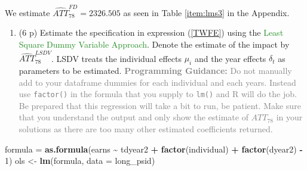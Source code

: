 \documentclass[
]{article}
\newenvironment{Shaded}{\begin{snugshade}}{\end{snugshade}}
\newcommand{\AttributeTok}[1]{\textcolor[rgb]{0.13,0.29,0.53}{#1}}
\newcommand{\DecValTok}[1]{\textcolor[rgb]{0.00,0.00,0.81}{#1}}
\newcommand{\FunctionTok}[1]{\textcolor[rgb]{0.13,0.29,0.53}{\textbf{#1}}}
\newcommand{\NormalTok}[1]{#1}
\newcommand{\OtherTok}[1]{\textcolor[rgb]{0.56,0.35,0.01}{#1}}
\newcommand{\SpecialCharTok}[1]{\textcolor[rgb]{0.81,0.36,0.00}{\textbf{#1}}}
\providecommand{\tightlist}{%
  \setlength{\itemsep}{0pt}\setlength{\parskip}{0pt}}
\begin{document}
\begin{Shaded}
\end{Shaded}

We estimate \(\widehat{ATT}_{78}^{FD} = 2326.505\) as seen in Table
\ref{item:lms3} in the Appendix.

\begin{enumerate}
\def\labelenumi{\arabic{enumi}.}
\setcounter{enumi}{2}
\tightlist
\item
  (6 p) Estimate the specification in expression (\ref{TWFE}) using the
  \textcolor{ForestGreen}{Least Square Dummy Variable Approach}. Denote
  the estimate of the impact by \(\widehat{ATT}_{78}^{LSDV}\). LSDV
  treats the individual effects \(\mu_i\) and the year effects
  \(\delta_t\) as parameters to be estimated.
  \textcolor{Gray}{\textbf{Programming Guidance:} Do not manually add to your dataframe dummies for each individual and each years. Instead use \texttt{factor()} in the formula that you supply to \texttt{lm()} and R will do the job. Be prepared that this regression will take a bit to run, be patient. Make sure that you understand the output and only show the estimate of ${ATT}_{78}$ in your solutions as there are too many other estimated coefficients returned.}\label{item:lsdv}
\end{enumerate}

\begin{Shaded}
\end{Shaded}

\begin{Shaded}
\begin{Highlighting}[]
\NormalTok{formula }\OtherTok{=} \FunctionTok{as.formula}\NormalTok{(earns }\SpecialCharTok{\textasciitilde{}}\NormalTok{ tdyear2 }\SpecialCharTok{+} \FunctionTok{factor}\NormalTok{(individual) }\SpecialCharTok{+} \FunctionTok{factor}\NormalTok{(dyear2) }\SpecialCharTok{{-}} \DecValTok{1}\NormalTok{)}
\NormalTok{ols }\OtherTok{\textless{}{-}} \FunctionTok{lm}\NormalTok{(formula, }\AttributeTok{data =}\NormalTok{ long\_psid)}
\end{Highlighting}
\end{Shaded}
\end{document}
